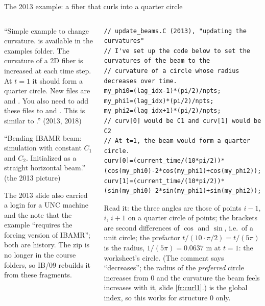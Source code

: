 \documentclass[aspectratio=169,11pt]{beamer}
\begin{document}
\begin{frame}[fragile]{The 2013 example: a fiber that curls into a quarter circle}
\label{fr:ex2013}
\begin{columns}[T,onlytextwidth]
\begin{column}{0.48\textwidth}
\footnotesize ``Simple example to change curvature.  is available in the examples folder. The curvature of a 2D fiber is increased at each time step. At $t = 1$ it should form a quarter circle. New files are  and . You also need to add these files to  and . This is similar to .'' (2013, 2018)
\vspace{1mm}

\footnotesize ``Bending IBAMR beam: simulation with constant $C_1$ and $C_2$. Initialized as a straight horizontal beam.'' (the 2013 picture)
\vspace{1mm}

\footnotesize The 2013 slide also carried a login for a UNC machine and the note that the example ``requires the forcing version of IBAMR''; both are history. The zip is no longer in the course folders, so IB/09 rebuilds it from these fragments.
\end{column}
\begin{column}{0.5\textwidth}
\begin{lstlisting}[style=cpptiny]
// update_beams.C (2013), "updating the curvatures"
// I've set up the code below to set the curvatures of the beam to the
// curvature of a circle whose radius decreases over time.
my_phi0=(lag_idx-1)*(pi/2)/npts;
my_phi1=(lag_idx)*(pi/2)/npts;
my_phi2=(lag_idx+1)*(pi/2)/npts;
// curv[0] would be C1 and curv[1] would be C2
// At t=1, the beam would form a quarter circle.
curv[0]=(current_time/(10*pi/2))*(cos(my_phi0)-2*cos(my_phi1)+cos(my_phi2));
curv[1]=(current_time/(10*pi/2))*(sin(my_phi0)-2*sin(my_phi1)+sin(my_phi2));
\end{lstlisting}
\footnotesize Read it: the three angles are those of points $i-1$, $i$, $i+1$ on a quarter circle of  points; the brackets are second differences of $\cos$ and $\sin$, i.e.\ of a unit circle; the prefactor $t/(10\cdot\pi/2) = t/(5\pi)$ is the radius, $1/(5\pi) = 0.0637$ m at $t = 1$: the worksheet's circle. (The comment says ``decreases''; the radius of the \emph{preferred} circle increases from 0 and the curvature the beam feels increases with it, slide \ref{fr:curl1}.)  is the global index, so this works for structure 0 only.
\end{column}
\end{columns}
\end{frame}
\end{document}
